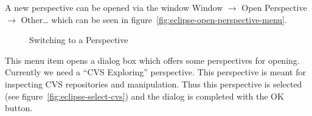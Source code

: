 \documentclass{extex-doc}
\newcommand\menu{\textsf}
\newcommand\sub{\(\rightarrow\) }
\begin{document}
A new perspective can be opened via the window \menu{Window \sub Open
  Perspective \sub Other\ldots} which can be seen in
figure~\ref{fig:eclipse-open-perspective-menu}.
\begin{figure}[ht]
  \hbox{}\hfill
  \hfill
  \hfill\hbox{}

  \caption{Switching to a Perspective}\label{fig:eclipse-perspective}
\end{figure}

This menu item opens a dialog box which offers some perspectives for
opening. Currently we need a ``CVS Exploring'' perspective. This
perspective is meant for inspecting CVS repositories and manipulation.
Thus this perspective is selected (see
figure~\ref{fig:eclipse-select-cvs}) and the dialog is completed with
the OK button.
\end{document}
